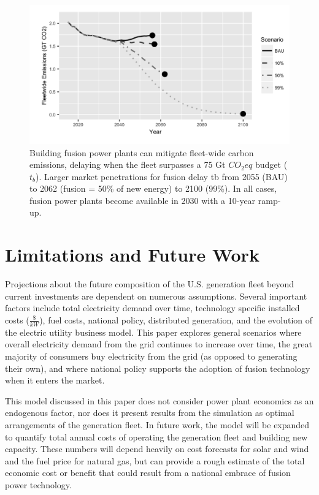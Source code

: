 \documentclass[preprint, 12pt]{elsarticle}
\begin{document}
\begin{figure}
\begin{center}
\includegraphics[scale=.5]{Fig4_5.png}
\end{center}
\caption{Building fusion power plants can mitigate fleet-wide carbon emissions, delaying when the fleet surpasses a 75 Gt $CO_2eq$ budget ($t_b$). Larger market penetrations for fusion delay tb from 2055 (BAU) to 2062 (fusion = 50\% of new energy) to 2100 (99\%). In all cases, fusion power plants become available in 2030 with a 10-year ramp-up.}
\end{figure}

\section{Limitations and Future Work}

Projections about the future composition of the U.S. generation fleet beyond current investments are dependent on numerous assumptions. Several important factors include total electricity demand over time, technology specific installed costs ($\frac{\$}{kW}$), fuel costs, national policy, distributed generation, and the evolution of the electric utility business model. This paper explores general scenarios where overall electricity demand from the grid continues to increase over time, the great majority of consumers buy electricity from the grid (as opposed to generating their own), and where national policy supports the adoption of fusion technology when it enters the market.

This model discussed in this paper does not consider power plant economics as an endogenous factor, nor does it present results from the simulation as optimal arrangements of the generation fleet. In future work, the model will be expanded to quantify total annual costs of operating the generation fleet and building new capacity. These numbers will depend heavily on cost forecasts for solar and wind and the fuel price for natural gas, but can provide a rough estimate of the total economic cost or benefit that could result from a national embrace of fusion power technology.
\end{document}
